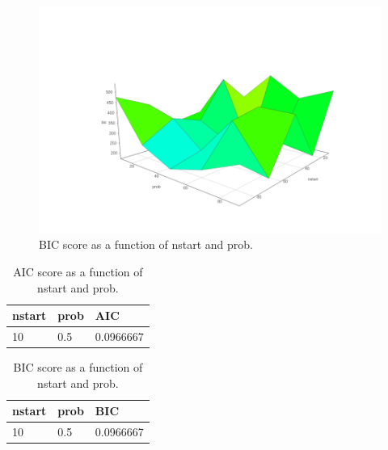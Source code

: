\documentclass[12pt]{article}
\theoremstyle{definition}
\begin{document}
\begin{figure}[H]
    \centering
    \includegraphics[width=0.8\linewidth]{rough2.png}
    \caption{BIC score as a function of nstart and prob.}
\label{fig:rough}
\end{figure}


\begin{table}[h]
\centering
\begin{tabular}{lll}
    nstart & prob & AIC \\
    \hline \hline
    10 & 0.5  & 0.0966667 \\
\end{tabular}
\caption{AIC score as a function of nstart and prob.}
\label{table1}
\end{table}

\begin{table}[h]
\centering
\begin{tabular}{lll}
    nstart & prob & BIC \\
    \hline \hline
    10 & 0.5  & 0.0966667 \\
\end{tabular}
\caption{BIC score as a function of nstart and prob.}
\label{table1}
\end{table}
\end{document}
